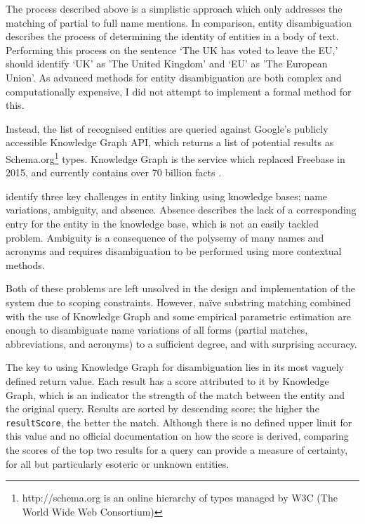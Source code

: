 The process described above is a simplistic approach which only addresses the matching of partial to full name mentions. In comparison, entity disambiguation describes the process of determining the identity of entities in a body of text. Performing this process on the sentence `The UK has voted to leave the EU,' should identify `UK' as 'The United Kingdom' and `EU' as 'The European Union'. As advanced methods for entity disambiguation are both complex and computationally expensive, I did not attempt to implement a formal method for this. 

Instead, the list of recognised entities are queried against Google's publicly accessible Knowledge Graph API, which returns a list of potential results as Schema.org\footnote{http://schema.org is an online hierarchy of types managed by W3C (The World Wide Web Consortium)} types. Knowledge Graph is the service which replaced Freebase in 2015, and currently contains over 70 billion facts \citep{knowledgegraph}.

\cite{EntityDisambiguationForKnowledgeBasePopulation} identify three key challenges in entity linking using knowledge bases; name variations, ambiguity, and absence. Absence describes the lack of a corresponding entry for the entity in the knowledge base, which is not an easily tackled problem. Ambiguity is a consequence of the polysemy of many names and acronyms and requires disambiguation to be performed using more contextual methods. 

Both of these problems are left unsolved in the design and implementation of the system due to scoping constraints. However, naïve substring matching combined with the use of Knowledge Graph and some empirical parametric estimation are enough to disambiguate name variations of all forms (partial matches, abbreviations, and acronyms) to a sufficient degree, and with surprising accuracy.

The key to using Knowledge Graph for disambiguation lies in its most vaguely defined return value. Each result has a score attributed to it by Knowledge Graph, which is an indicator the strength of the match between the entity and the original query. Results are sorted by descending score; the higher the \texttt{resultScore}, the better the match. Although there is no defined upper limit for this value and no official documentation on how the score is derived, comparing the scores of the top two results for a query can provide a measure of certainty, for all but particularly esoteric or unknown entities.

